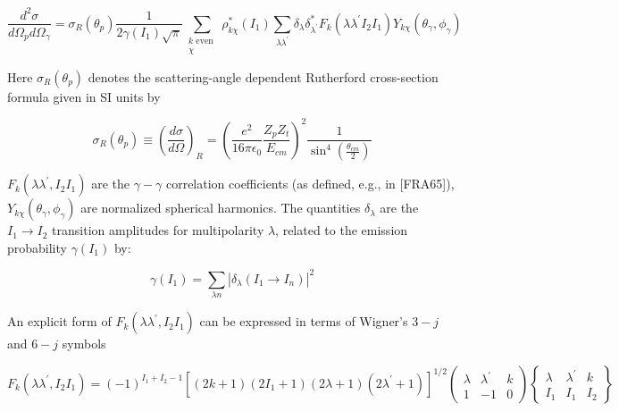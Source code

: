 \documentclass[10pt]{article}
\begin{document}
\begin{equation*}
\frac{d^{2} \sigma}{d \Omega_{p} d \Omega_{\gamma}}=\sigma_{R}\left(\theta_{p}\right) \frac{1}{2 \gamma\left(I_{1}\right) \sqrt{\pi}} \sum_{\substack{k \text { even } \\ \chi}} \rho_{k \chi}^{*}\left(I_{1}\right) \sum_{\lambda \lambda^{\prime}} \delta_{\lambda} \delta_{\lambda^{\prime}}^{*} F_{k}\left(\lambda \lambda^{\prime} I_{2} I_{1}\right) Y_{k \chi}\left(\theta_{\gamma}, \phi_{\gamma}\right) \tag{4.6}
\end{equation*}


Here $\sigma_{R}\left(\theta_{p}\right)$ denotes the scattering-angle dependent Rutherford cross-section formula given in SI units by


\begin{equation*}
\sigma_{R}\left(\theta_{p}\right) \equiv\left(\frac{d \sigma}{d \Omega}\right)_{R}=\left(\frac{e^{2}}{16 \pi \epsilon_{0}} \frac{Z_{p} Z_{t}}{E_{c m}}\right)^{2} \frac{1}{\sin ^{4}\left(\frac{\theta_{c m}}{2}\right)} \tag{4.7}
\end{equation*}


$F_{k}\left(\lambda \lambda^{\prime}, I_{2} I_{1}\right)$ are the $\gamma-\gamma$ correlation coefficients (as defined, e.g., in [FRA65]), $Y_{k \chi}\left(\theta_{\gamma}, \phi_{\gamma}\right)$ are normalized spherical harmonics. The quantities $\delta_{\lambda}$ are the $I_{1} \rightarrow I_{2}$ transition amplitudes for multipolarity $\lambda$, related to the emission probability $\gamma\left(I_{1}\right)$ by:


\begin{equation*}
\gamma\left(I_{1}\right)=\sum_{\lambda n}\left|\delta_{\lambda}\left(I_{1} \rightarrow I_{n}\right)\right|^{2} \tag{4.8}
\end{equation*}


An explicit form of $F_{k}\left(\lambda \lambda^{\prime}, I_{2} I_{1}\right)$ can be expressed in terms of Wigner's $3-j$ and $6-j$ symbols

\[
F_{k}\left(\lambda \lambda^{\prime}, I_{2} I_{1}\right)=(-1)^{I_{1}+I_{2}-1}\left[(2 k+1)\left(2 I_{1}+1\right)(2 \lambda+1)\left(2 \lambda^{\prime}+1\right)\right]^{1 / 2}\left(\begin{array}{ccc}
\lambda & \lambda^{\prime} & k  \tag{4.9}\\
1 & -1 & 0
\end{array}\right)\left\{\begin{array}{ccc}
\lambda & \lambda^{\prime} & k \\
I_{1} & I_{1} & I_{2}
\end{array}\right\}
\]
\end{document}
